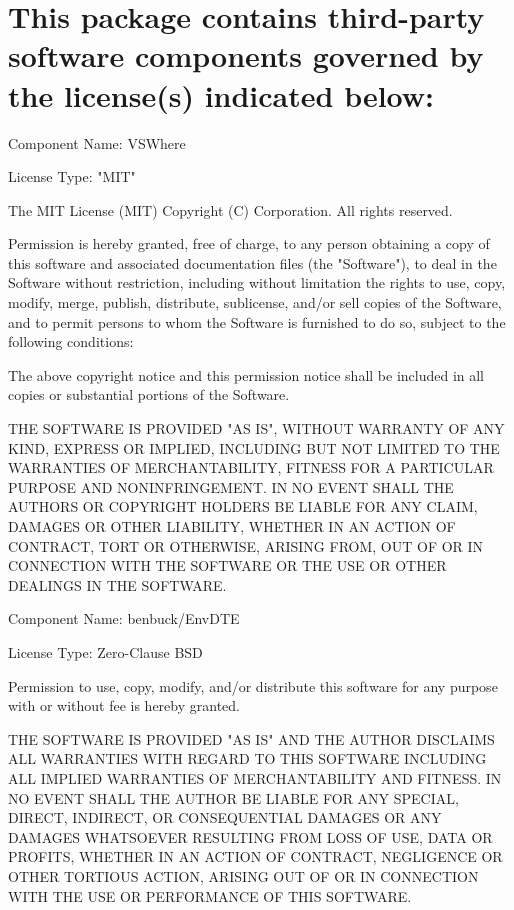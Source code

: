 \chapter{This package contains third-\/party software components governed by the license(s) indicated below\+:}
\hypertarget{md__library_2_package_cache_2com_8unity_8ide_8visualstudio_0d2_80_822_2_third_party_notices}{}\label{md__library_2_package_cache_2com_8unity_8ide_8visualstudio_0d2_80_822_2_third_party_notices}
Component Name\+: VSWhere

License Type\+: "{}\+MIT"{}

The MIT License (MIT) Copyright (C)  Corporation. All rights reserved.

Permission is hereby granted, free of charge, to any person obtaining a copy of this software and associated documentation files (the "{}\+Software"{}), to deal in the Software without restriction, including without limitation the rights to use, copy, modify, merge, publish, distribute, sublicense, and/or sell copies of the Software, and to permit persons to whom the Software is furnished to do so, subject to the following conditions\+:

The above copyright notice and this permission notice shall be included in all copies or substantial portions of the Software.

THE SOFTWARE IS PROVIDED "{}\+AS IS"{}, WITHOUT WARRANTY OF ANY KIND, EXPRESS OR IMPLIED, INCLUDING BUT NOT LIMITED TO THE WARRANTIES OF MERCHANTABILITY, FITNESS FOR A PARTICULAR PURPOSE AND NONINFRINGEMENT. IN NO EVENT SHALL THE AUTHORS OR COPYRIGHT HOLDERS BE LIABLE FOR ANY CLAIM, DAMAGES OR OTHER LIABILITY, WHETHER IN AN ACTION OF CONTRACT, TORT OR OTHERWISE, ARISING FROM, OUT OF OR IN CONNECTION WITH THE SOFTWARE OR THE USE OR OTHER DEALINGS IN THE SOFTWARE.

 Component Name\+: benbuck/\+Env\+DTE

License Type\+: Zero-\/\+Clause BSD

Permission to use, copy, modify, and/or distribute this software for any purpose with or without fee is hereby granted.

THE SOFTWARE IS PROVIDED "{}\+AS IS"{} AND THE AUTHOR DISCLAIMS ALL WARRANTIES WITH REGARD TO THIS SOFTWARE INCLUDING ALL IMPLIED WARRANTIES OF MERCHANTABILITY AND FITNESS. IN NO EVENT SHALL THE AUTHOR BE LIABLE FOR ANY SPECIAL, DIRECT, INDIRECT, OR CONSEQUENTIAL DAMAGES OR ANY DAMAGES WHATSOEVER RESULTING FROM LOSS OF USE, DATA OR PROFITS, WHETHER IN AN ACTION OF CONTRACT, NEGLIGENCE OR OTHER TORTIOUS ACTION, ARISING OUT OF OR IN CONNECTION WITH THE USE OR PERFORMANCE OF THIS SOFTWARE. 